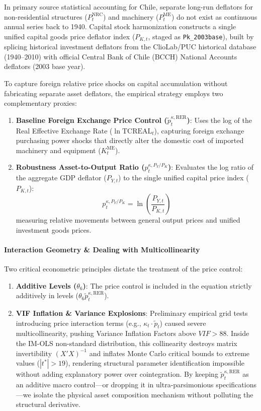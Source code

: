 In primary source statistical accounting for Chile, separate long-run deflators for non-residential structures ($P_t^{\text{NRC}}$) and machinery ($P_t^{\text{ME}}$) do not exist as continuous annual series back to 1940. Capital stock harmonization constructs a single unified capital goods price deflator index ($P_{K,t}$, staged as \texttt{Pk\_2003base}), built by splicing historical investment deflators from the ClioLab/PUC historical database (1940--2010) with official Central Bank of Chile (BCCH) National Accounts deflators (2003 base year).

To capture foreign relative price shocks on capital accumulation without fabricating separate asset deflators, the empirical strategy employs two complementary proxies:
\begin{enumerate}
	\item \textbf{Baseline Foreign Exchange Price Control ($\tilde{p}_t^{\kappa, \text{RER}}$)}: Uses the log of the Real Effective Exchange Rate ($\ln\text{TCREAL}_t$), capturing foreign exchange purchasing power shocks that directly alter the domestic cost of imported machinery and equipment ($K_t^{\text{ME}}$).
	\item \textbf{Robustness Asset-to-Output Ratio ($p_t^{\kappa, P_Y/P_K}$)}: Evaluates the log ratio of the aggregate GDP deflator ($P_{Y,t}$) to the single unified capital price index ($P_{K,t}$):
	\begin{equation}
		p_t^{\kappa, P_Y/P_K} = \ln\left(\frac{P_{Y,t}}{P_{K,t}}\right)
	\end{equation}
	measuring relative movements between general output prices and unified investment goods prices.
\end{enumerate}

\paragraph{Interaction Geometry \& Dealing with Multicollinearity}
Two critical econometric principles dictate the treatment of the price control:
\begin{enumerate}
	\item \textbf{Additive Levels  ($\theta_6$)}: The price control is included in the equation strictly additively in levels ($\theta_6 \tilde{p}_t^{\kappa, \text{RER}}$). 
	\item \textbf{VIF Inflation \& Variance Explosions}: Preliminary empirical grid tests introducing price interaction terms (e.g., $\kappa_t \cdot \tilde{p}_t$) caused severe multicollinearity, pushing Variance Inflation Factors above $VIF > 88$. Inside the IM-OLS non-standard distribution, this collinearity destroys matrix invertibility $(X'X)^{-1}$ and inflates Monte Carlo critical bounds to extreme values ($|t^*| > 19$), rendering structural parameter identification impossible without adding explanatory power over cointegration. By keeping $\tilde{p}_t^{\kappa, \text{RER}}$ as an additive macro control---or dropping it in ultra-parsimonious specifications---we isolate the physical asset composition mechanism without polluting the structural derivative.
\end{enumerate}

